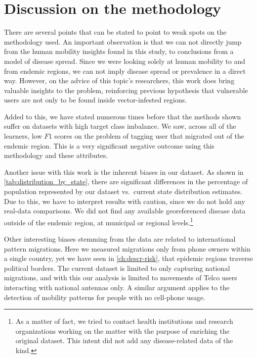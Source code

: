 \section{Discussion on the methodology}

There are several points that can be stated to point to weak spots on the methodology used.
An important observation is that we can not directly jump from the human mobility insights found in this study, to conclusions from a model of disease spread.
Since we were looking solely at human mobility to and from endemic regions, we can not imply disease spread or prevalence in a direct way.
However, on the advice of this topic's researchers, this work does bring valuable insights to the problem, reinforcing previous hypothesis that vulnerable users are not only to be found inside vector-infested regions.


Added to this, we have stated numerous times before that the methods shown suffer on datasets with high target class imbalance.
We saw, across all of the learners, low $F1$ scores on the problem of tagging user that migrated out of the endemic region. This is a very significant negative outcome using this methodology and these attributes.

Another issue with this work is the inherent biases in our dataset.
As shown in \cref{tab:distribution_by_state}, there are significant differences in the percentage of population represented by our dataset vs.\ current state distribution estimates.
Due to this, we have to interpret results with caution, since we do not hold any real-data comparisons.
We did not find any available georeferenced disease data outside of the endemic region, at municipal or regional levels.\footnote{As a matter of fact, we tried to contact health institutions and research organizations working on the matter with the purpose of enriching the original dataset.
This intent did not add any disease-related data of the kind.}

Other interesting biases stemming from the data are related to international pattern migrations.
Here we measured migrations only from phone owners within a single country, yet we have seen in \cref{ch:descr-risk}, that  epidemic regions traverse political borders.
The current dataset is limited to only capturing national migrations, and with this our analysis is limited to movements of Telco users interacting with national antennas only.
A similar argument applies to the detection of mobility patterns for people with no cell-phone usage.

